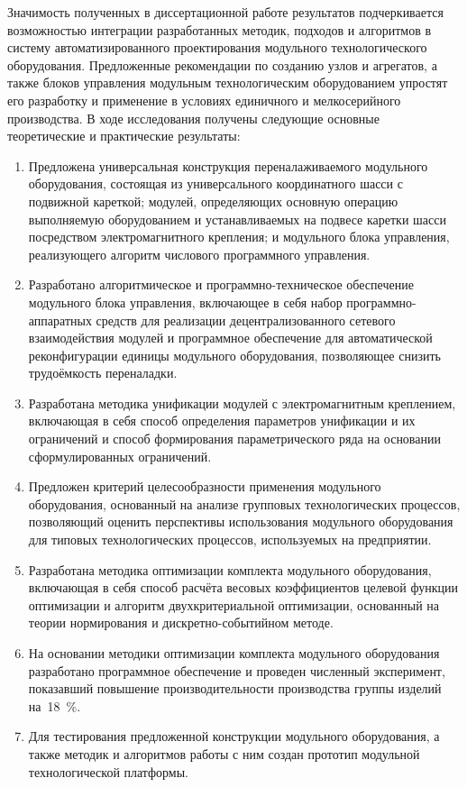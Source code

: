 
Значимость полученных в диссертационной работе результатов подчеркивается возможностью интеграции разработанных методик, подходов и алгоритмов в систему автоматизированного проектирования модульного технологического оборудования. Предложенные рекомендации по созданию узлов и агрегатов, а также блоков управления модульным технологическим оборудованием упростят его разработку и применение в условиях единичного и мелкосерийного производства.  В ходе исследования получены следующие основные теоретические и практические результаты:

\begin{enumerate}
  \item Предложена универсальная конструкция переналаживаемого модульного оборудования, состоящая из универсального координатного шасси с подвижной кареткой; модулей, определяющих основную операцию выполняемую оборудованием и устанавливаемых на подвесе каретки шасси посредством электромагнитного крепления; и модульного блока управления, реализующего алгоритм числового программного управления. 
  \item Разработано алгоритмическое и программно-техническое обеспечение модульного блока управления, включающее в себя набор программно-аппаратных средств для реализации децентрализованного сетевого взаимодействия модулей и программное обеспечение для автоматической реконфигурации единицы модульного оборудования, позволяющее снизить трудоёмкость переналадки.  
  \item Разработана методика унификации модулей с электромагнитным креплением, включающая в себя способ определения параметров унификации и их ограничений и способ формирования параметрического ряда на основании сформулированных ограничений.
  \item Предложен критерий целесообразности применения модульного оборудования, основанный на анализе групповых технологических процессов, позволяющий оценить  перспективы использования модульного оборудования для типовых технологических процессов, используемых на предприятии.
  \item Разработана методика оптимизации комплекта модульного оборудования, включающая в себя способ расчёта весовых коэффициентов целевой функции оптимизации и алгоритм двухкритериальной оптимизации, основанный на теории нормирования и дискретно-событийном методе.
  \item На основании методики оптимизации комплекта модульного оборудования разработано программное обеспечение и проведен численный эксперимент, показавший повышение производительности производства группы изделий на~\SI{18}{\percent}.
  \item Для тестирования предложенной конструкции модульного оборудования, а также методик и алгоритмов работы с ним создан прототип модульной технологической платформы.
\end{enumerate}

